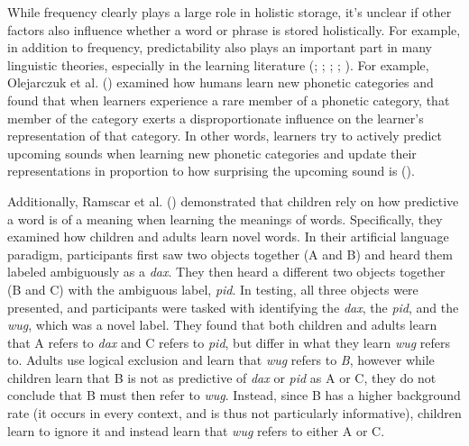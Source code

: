 \documentclass[
  12pt,
  letterpaper,
]{scrreport}
\begin{document}
While frequency clearly plays a large role in holistic storage, it's
unclear if other factors also influence whether a word or phrase is
stored holistically. For example, in addition to frequency,
predictability also plays an important part in many linguistic theories,
especially in the learning literature
(;
;
; ; ). For example, Olejarczuk et al.
()
examined how humans learn new phonetic categories and found that when
learners experience a rare member of a phonetic category, that member of
the category exerts a disproportionate influence on the learner's
representation of that category. In other words, learners try to
actively predict upcoming sounds when learning new phonetic categories
and update their representations in proportion to how surprising the
upcoming sound is
().

Additionally, Ramscar et al.
()
demonstrated that children rely on how predictive a word is of a meaning
when learning the meanings of words. Specifically, they examined how
children and adults learn novel words. In their artificial language
paradigm, participants first saw two objects together (A and B) and
heard them labeled ambiguously as a \emph{dax}. They then heard a
different two objects together (B and C) with the ambiguous label,
\emph{pid}. In testing, all three objects were presented, and
participants were tasked with identifying the \emph{dax}, the
\emph{pid}, and the \emph{wug}, which was a novel label. They found that
both children and adults learn that A refers to \emph{dax} and C refers
to \emph{pid}, but differ in what they learn \emph{wug} refers to.
Adults use logical exclusion and learn that \emph{wug} refers to
\emph{B}, however while children learn that B is not as predictive of
\emph{dax} or \emph{pid} as A or C, they do not conclude that B must
then refer to \emph{wug}. Instead, since B has a higher background rate
(it occurs in every context, and is thus not particularly informative),
children learn to ignore it and instead learn that \emph{wug} refers to
either A or C.
\end{document}
